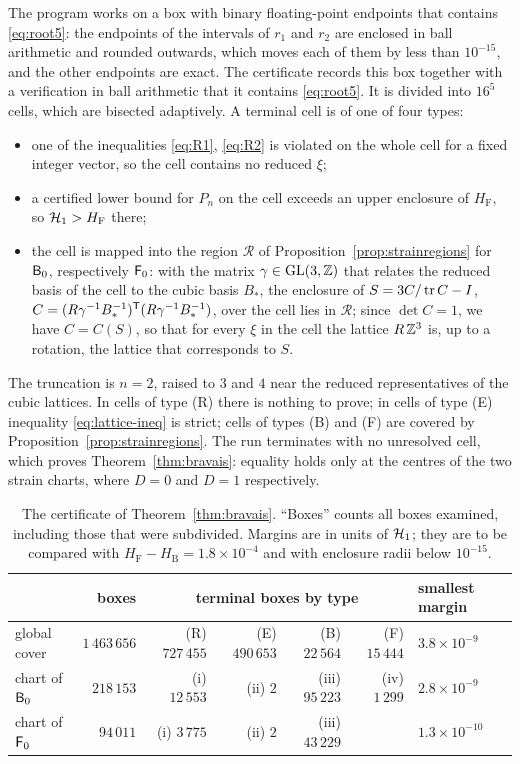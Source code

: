 The program works on a box with binary floating-point endpoints that contains \eqref{eq:root5}: the endpoints of the intervals
of $r_1$ and $r_2$ are enclosed in ball arithmetic and rounded outwards, which moves each of them by less than $10^{-15}$, and the
other endpoints are exact. The certificate records this box together with a verification in ball arithmetic that it contains
\eqref{eq:root5}. It is divided into $16^5$ cells, which are bisected adaptively. A terminal cell is of one of four types:
\begin{itemize}
\item[(R)] one of the inequalities \eqref{eq:R1}, \eqref{eq:R2} is violated on the whole cell for a fixed integer vector, so the cell
contains no reduced $\xi$;
\item[(E)] a certified lower bound for $P_n$ on the cell exceeds an upper enclosure of $H_\mathrm F$, so $\mathcal H_1>H_\mathrm F$ there;
\item[(B), (F)] the cell is mapped into the region $\mathcal R$ of Proposition~\ref{prop:strainregions} for $\mathsf B_0$, respectively $\mathsf F_0$:
with the matrix $\gamma\in\mathrm{GL}(3,\mathbb Z)$ that relates the reduced basis of the cell to the cubic basis $B_\ast$, the enclosure of
$S=3C/\operatorname{tr} C-I$, $C=(R\gamma^{-1}B_\ast^{-1})^\mathsf T(R\gamma^{-1}B_\ast^{-1})$, over the cell lies in $\mathcal R$; since $\det C=1$, we
have $C=C(S)$, so that for every $\xi$ in the cell the lattice $R\,\mathbb Z^3$ is, up to a rotation, the lattice that corresponds to
$S$.
\end{itemize}
The truncation is $n=2$, raised to $3$ and $4$ near the reduced representatives of the cubic lattices. In cells of type (R) there is
nothing to prove; in cells of type (E) inequality \eqref{eq:lattice-ineq} is strict; cells of types (B) and (F) are covered by
Proposition~\ref{prop:strainregions}. The run terminates with no unresolved cell, which proves Theorem~\ref{thm:bravais}: equality
holds only at the centres of the two strain charts, where $D=0$ and $D=1$ respectively.

\begin{table}[h]
\begin{tabular}{lrrrrrl}
\toprule
 & boxes & \multicolumn{4}{c}{terminal boxes by type} & smallest margin\\
\midrule
global cover & $1\,463\,656$ & (R) $727\,455$ & (E) $490\,653$ & (B) $22\,564$ & (F) $15\,444$ & $3.8\times10^{-9}$\\
chart of $\mathsf B_0$ & $218\,153$ & (i) $12\,553$ & (ii) $2$ & (iii) $95\,223$ & (iv) $1\,299$ & $2.8\times10^{-9}$\\
chart of $\mathsf F_0$ & $94\,011$ & (i) $3\,775$ & (ii) $2$ & (iii) $43\,229$ & & $1.3\times10^{-10}$\\
\bottomrule
\end{tabular}
\caption{The certificate of Theorem~\ref{thm:bravais}. ``Boxes'' counts all boxes examined, including those that were subdivided.
Margins are in units of $\mathcal H_1$; they are to be compared with $H_\mathrm F-H_\mathrm B=1.8\times10^{-4}$ and with enclosure radii below
$10^{-15}$.}\label{tab:bravais}
\end{table}
